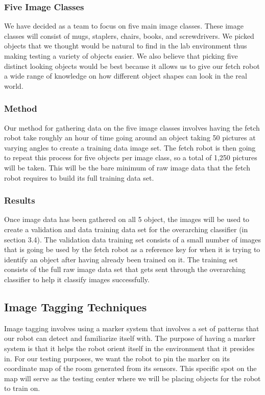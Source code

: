 \documentclass[draftclsnofoot, onecolumn, 10pt, compsoc]{IEEEtran}
\begin{document}
			\subsubsection{Five Image Classes}
				We have decided as a team to focus on five main image classes. These image classes will consist of mugs, staplers, chairs, books, and screwdrivers. We picked objects that we thought would be natural to find in the lab environment thus making testing a variety of objects easier. We also believe that picking five distinct looking objects would be best because it allows us to give our fetch robot a wide range of knowledge on how different object shapes can look in the real world. 
			
			\subsubsection{Method}
				Our method for gathering data on the five image classes involves having the fetch robot take roughly an hour of time going around an object taking 50 pictures at varying angles to create a training data image set. The fetch robot is then going to repeat this process for five objects per image class, so a total of 1,250 pictures will be taken. This will be the bare minimum of raw image data that the fetch robot requires to build its full training data set.
		
			\subsubsection{Results}
				Once image data has been gathered on all 5 object, the images will be used to create a validation and data training data set for the overarching classifier (in section 3.4). The validation data training set consists of a small number of images that is going be used by the fetch robot as a reference key for when it is trying to identify an object after having already been trained on it. The training set consists of the full raw image data set that gets sent through the overarching classifier to help it classify images successfully.
		
		\subsection{Image Tagging Techniques}
			Image tagging involves using a marker system that involves a set of patterns that our robot can detect and familiarize itself with. The purpose of having a marker system is that it helps the robot orient itself in the environment that it presides in. For our testing purposes, we want the robot to pin the marker on its coordinate map of the room generated from its sensors. This specific spot on the map will serve as the testing center where we will be placing objects for the robot to train on.
		
\end{document}
